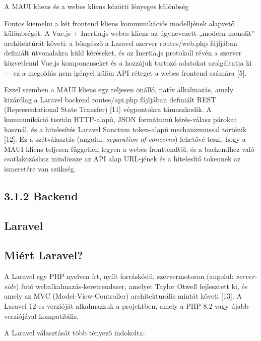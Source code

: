 A MAUI kliens és a webes kliens közötti lényeges különbség

Fontos kiemelni a két frontend kliens kommunikációs modelljének alapvető különbségét. A Vue.js + Inertia.js webes kliens az úgynevezett „modern monolit'' architektúrát követi: a böngésző a Laravel szerver routes/web.php fájljában definiált útvonalakra küld kéréseket, és az Inertia.js protokoll révén a szerver közvetlenül Vue.js komponenseket és a hozzájuk tartozó adatokat szolgáltatja ki --- ez a megoldás nem igényel külön API réteget a webes frontend számára {[}5{]}.

Ezzel szemben a MAUI kliens egy teljesen önálló, natív alkalmazás, amely kizárólag a Laravel backend routes/api.php fájljában definiált REST (Representational State Transfer) {[}11{]} végpontokra támaszkodik. A kommunikáció tisztán HTTP-alapú, JSON formátumú kérés-válasz párokat használ, és a hitelesítés Laravel Sanctum token-alapú mechanizmussal történik {[}12{]}. Ez a szétválasztás (angolul: \emph{separation of concerns}) lehetővé teszi, hogy a MAUI kliens teljesen független legyen a webes fronttendtől, és a backendhez való csatlakozáshoz mindössze az API alap URL-jének és a hitelesítő tokennek az ismeretére van szükség.

\subsection{3.1.2 Backend}\label{backend}

\subsection{Laravel}\label{laravel}

\subsection{Miért Laravel?}\label{miuxe9rt-laravel}

A Laravel egy PHP nyelven írt, nyílt forráskódú, szervermotoron (angolul: \emph{server-side}) futó webalkalmazás-keretrendszer, amelyet Taylor Otwell fejlesztett ki, és amely az MVC (Model-View-Controller) architekturális mintát követi {[}13{]}. A Laravel 12-es verzióját alkalmazzuk a projektben, amely a PHP 8.2 vagy újabb verziójával kompatibilis.

A Laravel választását több tényező indokolta:

